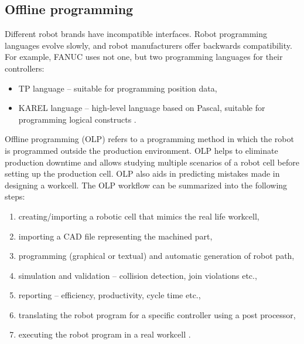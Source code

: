 \subsection{Offline programming}
Different robot brands have incompatible interfaces. Robot programming languages evolve slowly, and robot manufacturers offer backwards compatibility. For example, FANUC uses not one, but two programming languages for their controllers: 

\begin{itemize}

 \item TP language -- suitable for programming position data,
 \item KAREL language -- high-level language based on Pascal, suitable for programming logical constructs \cite{fanuchandling}.

\end{itemize}

Offline programming  (OLP) refers to a programming method in which the robot is programmed outside the production environment. OLP helps to eliminate production downtime and allows studying multiple scenarios of a robot cell before setting up the production cell. OLP also aids in predicting mistakes made in designing a workcell. The OLP workflow can be summarized into the following steps:

\begin{enumerate}
  \item creating/importing a robotic cell that mimics the real life workcell,
  \item importing a CAD file representing the machined part,
  \item programming (graphical or textual) and automatic generation of robot path,
  \item simulation and validation -- collision detection, join violations etc.,
  \item reporting -- efficiency, productivity, cycle time etc.,
  \item translating the robot program for a specific controller using a post processor,
  \item executing the robot program in a real workcell \cite{offlinesteps}.
\end{enumerate}
